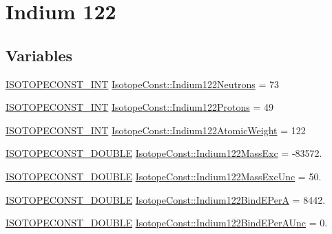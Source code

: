 \hypertarget{group___isotope_const-_indium-_in122}{}\section{Indium 122}
\label{group___isotope_const-_indium-_in122}
\subsection*{Variables}
\begin{DoxyCompactItemize}
\item 
\mbox{\hyperlink{group___isotope_const-_macros_ga5f18360b3e99483a35c32d789e62621c}{I\+S\+O\+T\+O\+P\+E\+C\+O\+N\+S\+T\+\_\+\+I\+NT}} \mbox{\hyperlink{group___isotope_const-_indium-_in122_ga440d2ddc373f294b7cc1bcd33d08ddd8}{Isotope\+Const\+::\+Indium122\+Neutrons}} = 73
\item 
\mbox{\hyperlink{group___isotope_const-_macros_ga5f18360b3e99483a35c32d789e62621c}{I\+S\+O\+T\+O\+P\+E\+C\+O\+N\+S\+T\+\_\+\+I\+NT}} \mbox{\hyperlink{group___isotope_const-_indium-_in122_ga0504a2ef16b32ef421b52377d92311a5}{Isotope\+Const\+::\+Indium122\+Protons}} = 49
\item 
\mbox{\hyperlink{group___isotope_const-_macros_ga5f18360b3e99483a35c32d789e62621c}{I\+S\+O\+T\+O\+P\+E\+C\+O\+N\+S\+T\+\_\+\+I\+NT}} \mbox{\hyperlink{group___isotope_const-_indium-_in122_ga28310a9f2e0d0f73006112f0cab03b8c}{Isotope\+Const\+::\+Indium122\+Atomic\+Weight}} = 122
\item 
\mbox{\hyperlink{group___isotope_const-_macros_ga8f45a7272ce02c0b4c65c44636ed719a}{I\+S\+O\+T\+O\+P\+E\+C\+O\+N\+S\+T\+\_\+\+D\+O\+U\+B\+LE}} \mbox{\hyperlink{group___isotope_const-_indium-_in122_ga7515cf5147357b000cf779a6b0b61566}{Isotope\+Const\+::\+Indium122\+Mass\+Exc}} = -\/83572.
\item 
\mbox{\hyperlink{group___isotope_const-_macros_ga8f45a7272ce02c0b4c65c44636ed719a}{I\+S\+O\+T\+O\+P\+E\+C\+O\+N\+S\+T\+\_\+\+D\+O\+U\+B\+LE}} \mbox{\hyperlink{group___isotope_const-_indium-_in122_gabb4dd455edc563cd0da480ff49926bd0}{Isotope\+Const\+::\+Indium122\+Mass\+Exc\+Unc}} = 50.
\item 
\mbox{\hyperlink{group___isotope_const-_macros_ga8f45a7272ce02c0b4c65c44636ed719a}{I\+S\+O\+T\+O\+P\+E\+C\+O\+N\+S\+T\+\_\+\+D\+O\+U\+B\+LE}} \mbox{\hyperlink{group___isotope_const-_indium-_in122_gae70996dfcbd3e21aae2a0043c31525ea}{Isotope\+Const\+::\+Indium122\+Bind\+E\+PerA}} = 8442.
\item 
\mbox{\hyperlink{group___isotope_const-_macros_ga8f45a7272ce02c0b4c65c44636ed719a}{I\+S\+O\+T\+O\+P\+E\+C\+O\+N\+S\+T\+\_\+\+D\+O\+U\+B\+LE}} \mbox{\hyperlink{group___isotope_const-_indium-_in122_gad9f6ab52a59d323bcf119837e8d2257e}{Isotope\+Const\+::\+Indium122\+Bind\+E\+Per\+A\+Unc}} = 0.

\end{DoxyCompactItemize}
